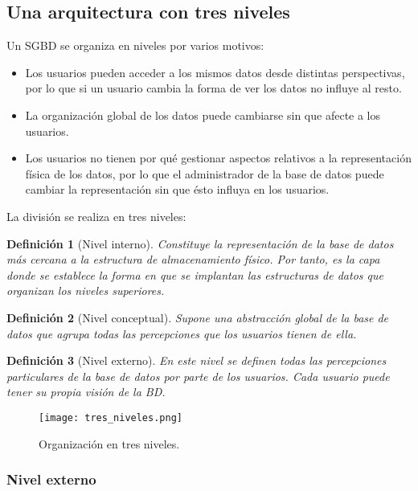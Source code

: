 \documentclass[12pt,spanish]{article}
\newtheorem{definition}{Definición}
\numberwithin{definition}{subsection}
\begin{document}
\subsection{Una arquitectura con tres niveles}
Un SGBD se organiza en niveles por varios motivos:
\begin{itemize}
	\item Los usuarios pueden acceder a los mismos datos desde distintas perspectivas, por lo que si un usuario cambia la forma de ver los datos no influye al resto.
	\item La organización global de los datos puede cambiarse sin que afecte a los usuarios.
	\item Los usuarios no tienen por qué gestionar aspectos relativos a la representación física de los datos, por lo que el administrador de la base de datos puede cambiar la representación sin que ésto influya en los usuarios.
\end{itemize}

La división se realiza en tres niveles:

\begin{definition}[Nivel interno]
Constituye la representación de la base de datos más cercana a la estructura de almacenamiento físico. Por tanto, es la capa donde se establece la forma en que se implantan las estructuras de datos que organizan los niveles superiores.
\end{definition}

\begin{definition}[Nivel conceptual]
Supone una abstracción global de la base de datos que agrupa todas las percepciones que los usuarios tienen de ella.
\end{definition}

\begin{definition}[Nivel externo]
En este nivel se definen todas las percepciones particulares de la base de datos por parte de los usuarios. Cada usuario puede tener su propia visión de la BD.
\end{definition}

\begin{figure}[H]
\centering
\texttt{[image: tres\_niveles.png]}
\caption{Organización en tres niveles.}
\end{figure}

\subsubsection{Nivel externo}
\end{document}
